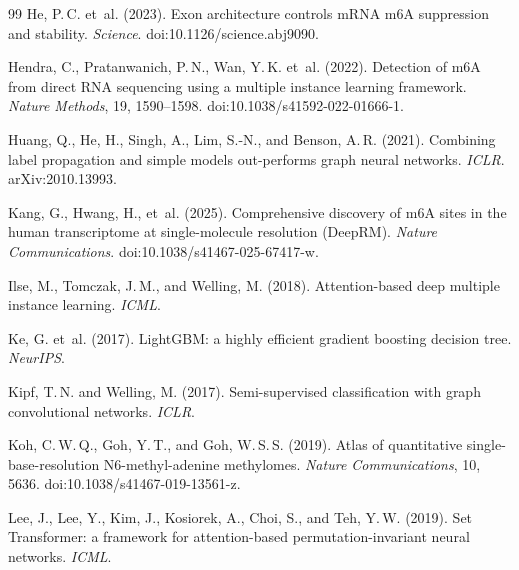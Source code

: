 \documentclass[11pt,a4paper]{article}
\begin{document}
\begin{thebibliography}{99}
    He, P.\,C. et~al. (2023).
    \newblock Exon architecture controls mRNA m6A suppression and stability.
    \newblock \textit{Science}. doi:10.1126/science.abj9090.

    Hendra, C., Pratanwanich, P.\,N., Wan, Y.\,K. et~al. (2022).
    \newblock Detection of m6A from direct RNA sequencing using a multiple instance learning framework.
    \newblock \textit{Nature Methods}, 19, 1590--1598. doi:10.1038/s41592-022-01666-1.

    Huang, Q., He, H., Singh, A., Lim, S.-N., and Benson, A.\,R. (2021).
    \newblock Combining label propagation and simple models out-performs graph neural networks.
    \newblock \textit{ICLR}. arXiv:2010.13993.

    Kang, G., Hwang, H., et~al. (2025).
    \newblock Comprehensive discovery of m6A sites in the human transcriptome at single-molecule resolution (DeepRM).
    \newblock \textit{Nature Communications}. doi:10.1038/s41467-025-67417-w.

    Ilse, M., Tomczak, J.\,M., and Welling, M. (2018).
    \newblock Attention-based deep multiple instance learning.
    \newblock \textit{ICML}.

    Ke, G. et~al. (2017).
    \newblock LightGBM: a highly efficient gradient boosting decision tree.
    \newblock \textit{NeurIPS}.

    Kipf, T.\,N. and Welling, M. (2017).
    \newblock Semi-supervised classification with graph convolutional networks.
    \newblock \textit{ICLR}.

    Koh, C.\,W.\,Q., Goh, Y.\,T., and Goh, W.\,S.\,S. (2019).
    \newblock Atlas of quantitative single-base-resolution N6-methyl-adenine methylomes.
    \newblock \textit{Nature Communications}, 10, 5636. doi:10.1038/s41467-019-13561-z.

    Lee, J., Lee, Y., Kim, J., Kosiorek, A., Choi, S., and Teh, Y.\,W. (2019).
    \newblock Set Transformer: a framework for attention-based permutation-invariant neural networks.
    \newblock \textit{ICML}.


\end{thebibliography}
\end{document}

